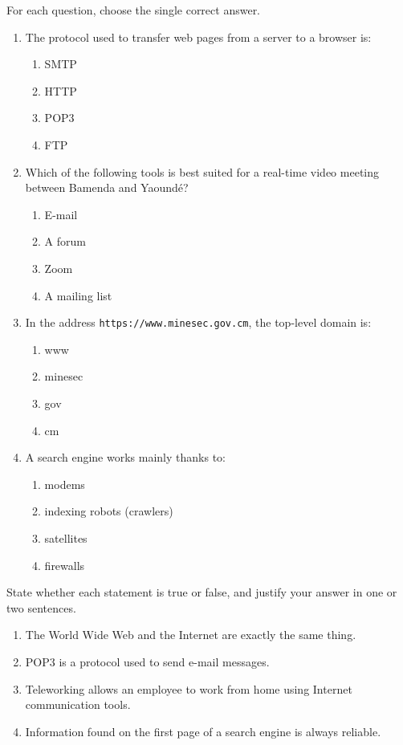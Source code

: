 \documentclass[11pt]{article}
\begin{document}
\begin{exercice}
For each question, choose the single correct answer.
\begin{enumerate}
\item The protocol used to transfer web pages from a server to a browser is:
\begin{enumerate}
\item SMTP \item HTTP \item POP3 \item FTP
\end{enumerate}
\item Which of the following tools is best suited for a real-time video meeting between Bamenda and Yaound\'e?
\begin{enumerate}
\item E-mail \item A forum \item Zoom \item A mailing list
\end{enumerate}
\item In the address \texttt{https://www.minesec.gov.cm}, the top-level domain is:
\begin{enumerate}
\item www \item minesec \item gov \item cm
\end{enumerate}
\item A search engine works mainly thanks to:
\begin{enumerate}
\item modems \item indexing robots (crawlers) \item satellites \item firewalls
\end{enumerate}
\end{enumerate}
\end{exercice}

\begin{exercice}
State whether each statement is true or false, and justify your answer in one or two sentences.
\begin{enumerate}
\item The World Wide Web and the Internet are exactly the same thing.
\item POP3 is a protocol used to send e-mail messages.
\item Teleworking allows an employee to work from home using Internet communication tools.
\item Information found on the first page of a search engine is always reliable.
\end{enumerate}
\end{exercice}
\end{document}
